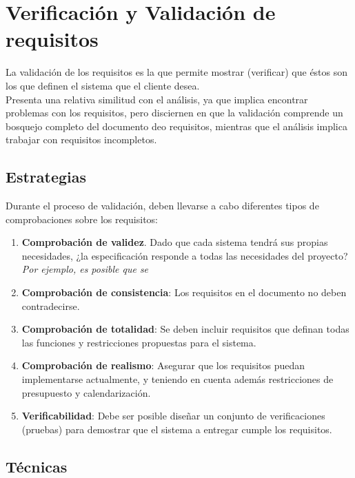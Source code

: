 \section{Verificación y Validación de requisitos}

La validación de los requisitos es la que permite mostrar (verificar) que éstos son los que definen el sistema que el cliente desea.\\

Presenta una relativa similitud con el análisis, ya que implica encontrar problemas con los requisitos, pero disciernen en que la validación comprende un bosquejo completo del documento deo requisitos, mientras que el análisis implica trabajar con requisitos incompletos.

\subsection{Estrategias}

Durante el proceso de validación, deben llevarse a cabo diferentes tipos de comprobaciones sobre los requisitos:

\begin{enumerate}
    \item \textbf{Comprobación de validez}. Dado que cada sistema tendrá sus propias necesidades, ¿la especificación responde a todas las necesidades del proyecto? \textit{Por ejemplo, es posible que se }
    \item \textbf{Comprobación de consistencia}: Los requisitos en el documento no deben contradecirse.
    \item \textbf{Comprobación de totalidad}: Se deben incluir requisitos que definan todas las funciones y restricciones propuestas para el sistema.
    \item \textbf{Comprobación de realismo}: Asegurar que los requisitos puedan implementarse actualmente, y teniendo en cuenta además restricciones de presupuesto y calendarización.
    \item \textbf{Verificabilidad}: Debe ser posible diseñar un conjunto de verificaciones (pruebas) para demostrar que el sistema a entregar cumple los requisitos.
\end{enumerate}

\subsection{Técnicas}

